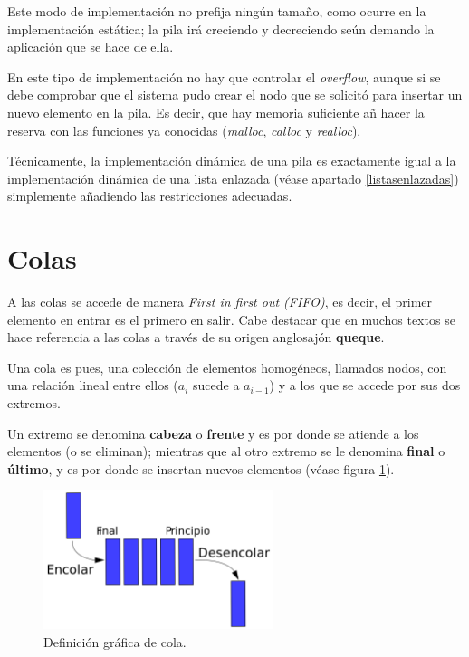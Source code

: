 \documentclass[a4paper, 11pt, titlepage]{article}
\begin{document}
        Este modo de implementación no prefija ningún tamaño, como ocurre en la implementación 
        estática; la pila irá creciendo y decreciendo seún demando la aplicación que se hace de 
        ella.

        En este tipo de implementación no hay que controlar el \textit{overflow}, aunque si se 
        debe comprobar que el sistema pudo crear el nodo que se solicitó para insertar un nuevo 
        elemento en la pila. Es decir, que hay memoria suficiente añ hacer la reserva con las 
        funciones ya conocidas (\textit{malloc}, \textit{calloc} y \textit{realloc}).

        Técnicamente, la implementación dinámica de una pila es exactamente igual a la implementación 
        dinámica de una lista enlazada (véase apartado \ref{listasenlazadas}) simplemente añadiendo las 
        restricciones adecuadas.

\section{Colas}

    A las colas se accede de manera \textit{First in first out (FIFO)}, es decir, el primer 
    elemento en entrar es el primero en salir. Cabe destacar que en muchos textos se hace referencia 
    a las colas a través de su origen anglosajón \textbf{queque}.

    Una cola es pues, una colección de elementos homogéneos, llamados nodos, con una relación lineal 
    entre ellos ($a_i$ sucede a $a_{i-1}$) y a los que se accede por sus dos extremos.

    Un extremo se denomina \textbf{cabeza} o \textbf{frente} y es por donde se atiende a los elementos
    (o se eliminan); mientras que al otro extremo se le denomina \textbf{final} o \textbf{último}, y es 
    por donde se insertan nuevos elementos (véase figura \ref{cola01}).

    \begin{figure}[htp]
        \centering
        \includegraphics[width=0.6\textwidth]{resources/cola01.png}
        \caption{Definición gráfica de cola.}
        \label{cola01}
    \end{figure}
\end{document}
